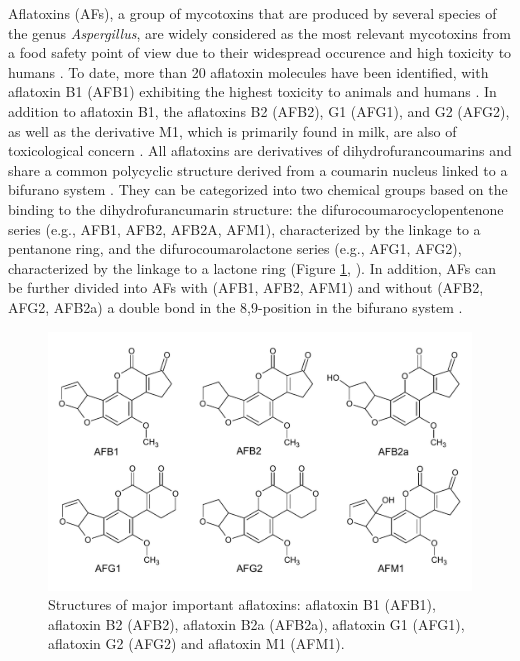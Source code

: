 Aflatoxins (AFs), a group of mycotoxins that are produced by several species of the genus \textit{Aspergillus}, are widely considered as the most relevant mycotoxins from a food safety point of view due to their widespread occurence and high toxicity to humans \citep{afsah2013review, jallow2021worldwide}. To date, more than 20 aflatoxin molecules have been identified, with aflatoxin B1 (AFB1) exhibiting the highest toxicity to animals and humans \citep{ismail2018aflatoxin}. In addition to aflatoxin B1, the aflatoxins B2 (AFB2), G1 (AFG1), and G2 (AFG2),  as well as the derivative M1, which is primarily found in milk, are also of toxicological concern \citep{caceres2020aflatoxin, haque2020mycotoxin}. All aflatoxins are derivatives of dihydrofurancoumarins and share a common polycyclic structure derived from a coumarin nucleus linked to a bifurano system \citep{abrehame2023aflatoxins, nazhand2020characteristics}. They can be categorized into two chemical groups based on the binding to the dihydrofurancumarin structure: the difurocoumarocyclopentenone series (e.g., AFB1, AFB2, AFB2A, AFM1), characterized by the linkage to a pentanone ring, and the difurocoumarolactone series (e.g., AFG1, AFG2), characterized by the linkage to a lactone ring (Figure \ref{fig:Aflatoxins_structures_portrait}, \cite{abrehame2023aflatoxins, nazhand2020characteristics}). In addition, AFs can be further divided into AFs with (AFB1, AFB2, AFM1) and without (AFB2, AFG2, AFB2a) a double bond in the 8,9-position in the bifurano system \citep{abrehame2023aflatoxins}. 

\begin{figure}[ht!]
	\centering
	\includegraphics[width=1\textwidth]{figures/aflatoxins_structures_portrait.pdf}
	\decoRule
	\captionsetup{labelfont=bf, justification=justified, singlelinecheck=false, width=1\textwidth} 
	\caption{Structures of major important aflatoxins: aflatoxin B1 (AFB1), aflatoxin B2 (AFB2), aflatoxin B2a (AFB2a), aflatoxin G1 (AFG1), aflatoxin G2 (AFG2) and aflatoxin M1 (AFM1).}
	\label{fig:Aflatoxins_structures_portrait}
\end{figure}

